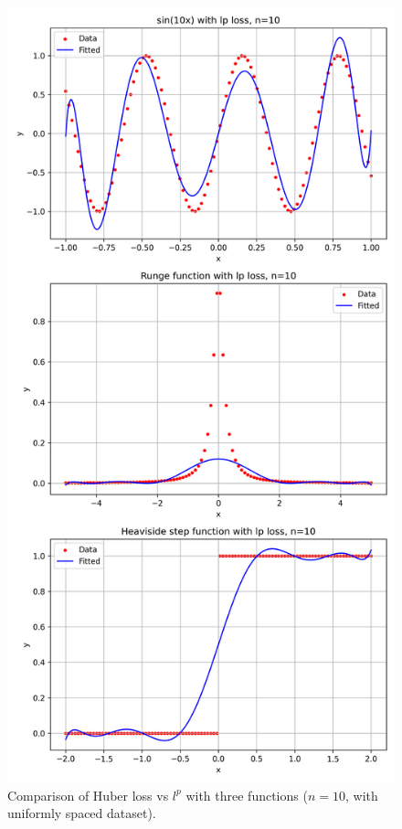\documentclass[a4paper,12pt]{article}
\begin{document}
\begin{figure}[b!]
\begin{minipage}{0.49\textwidth}
    \end{minipage}
    \hfill
    \begin{minipage}{0.49\textwidth}
        \centering
        \includegraphics[width=\linewidth]{fig/compare_lp_loss.png}
    \end{minipage}

    \caption{Comparison of Huber loss vs \( l^p \) with three functions ($n=10$, with uniformly spaced dataset).}
    \label{fig:comparison}
\end{figure}
\end{document}
